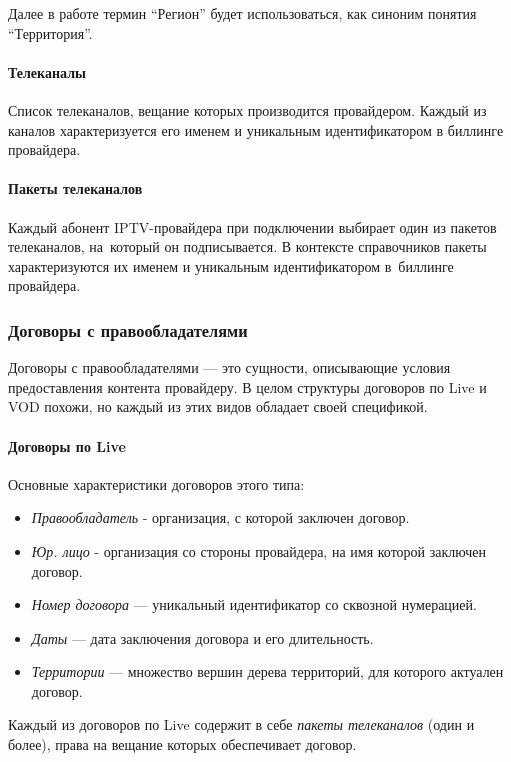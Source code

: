 Далее в работе термин ``Регион'' будет использоваться, как синоним понятия ``Территория''.

\paragraph{Телеканалы}
Список телеканалов, вещание которых производится провайдером. Каждый из каналов характеризуется его именем
и уникальным идентификатором в биллинге провайдера.

\paragraph{Пакеты телеканалов}
Каждый абонент IPTV-провайдера при подключении выбирает один из пакетов телеканалов, на~который
он подписывается. В контексте справочников пакеты характеризуются их именем и уникальным идентификатором
в~биллинге провайдера.

\subsubsection{Договоры с правообладателями}
\label{task:contracts}

Договоры с правообладателями --- это сущности, описывающие условия предоставления контента провайдеру.
В целом структуры договоров по Live и VOD похожи, но каждый из этих видов обладает своей спецификой.

\paragraph{Договоры по Live}
Основные характеристики договоров этого типа:

\begin{itemize}
\item{
  \textit{Правообладатель} - организация, с которой заключен договор.
}
\item{
  \textit{Юр. лицо} -  организация со стороны провайдера, на имя которой заключен договор.
}
\item{
  \textit{Номер договора} ---  уникальный идентификатор со сквозной нумерацией.
}
\item{
  \textit{Даты} --- дата заключения договора и его длительность.
}
\item{
  \textit{Территории} --- множество вершин дерева территорий, для которого актуален договор.
}
\end{itemize}

Каждый из договоров по Live содержит в себе \textit{пакеты телеканалов} (один и более), права на вещание которых обеспечивает договор.


